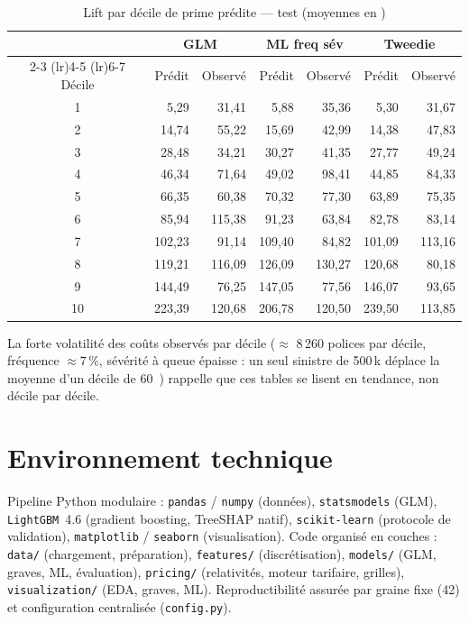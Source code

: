 \documentclass[11pt,a4paper]{article}
\newcommand{\eur}{\texteuro}
\begin{document}
\begin{table}[H]
\centering
\caption{Lift par décile de prime prédite --- test (moyennes en \eur)}
\small
\begin{tabular}{c rr rr rr}
\toprule
 & \multicolumn{2}{c}{GLM} & \multicolumn{2}{c}{ML freq \texttimes{} sév} & \multicolumn{2}{c}{Tweedie} \\
\cmidrule(lr){2-3} \cmidrule(lr){4-5} \cmidrule(lr){6-7}
Décile & Prédit & Observé & Prédit & Observé & Prédit & Observé \\
\midrule
1  & 5{,}29   & 31{,}41  & 5{,}88   & 35{,}36  & 5{,}30   & 31{,}67 \\
2  & 14{,}74  & 55{,}22  & 15{,}69  & 42{,}99  & 14{,}38  & 47{,}83 \\
3  & 28{,}48  & 34{,}21  & 30{,}27  & 41{,}35  & 27{,}77  & 49{,}24 \\
4  & 46{,}34  & 71{,}64  & 49{,}02  & 98{,}41  & 44{,}85  & 84{,}33 \\
5  & 66{,}35  & 60{,}38  & 70{,}32  & 77{,}30  & 63{,}89  & 75{,}35 \\
6  & 85{,}94  & 115{,}38 & 91{,}23  & 63{,}84  & 82{,}78  & 83{,}14 \\
7  & 102{,}23 & 91{,}14  & 109{,}40 & 84{,}82  & 101{,}09 & 113{,}16 \\
8  & 119{,}21 & 116{,}09 & 126{,}09 & 130{,}27 & 120{,}68 & 80{,}18 \\
9  & 144{,}49 & 76{,}25  & 147{,}05 & 77{,}56  & 146{,}07 & 93{,}65 \\
10 & 223{,}39 & 120{,}68 & 206{,}78 & 120{,}50 & 239{,}50 & 113{,}85 \\
\bottomrule
\end{tabular}
\end{table}

La forte volatilité des coûts observés par décile ($\approx$ 8\,260 polices par décile, fréquence $\approx 7\,\%$, sévérité à queue épaisse : un seul sinistre de 500\,k\eur{} déplace la moyenne d'un décile de 60~\eur) rappelle que ces tables se lisent en tendance, non décile par décile.

\section{Environnement technique}

Pipeline Python modulaire : \texttt{pandas} / \texttt{numpy} (données), \texttt{statsmodels} (GLM), \texttt{LightGBM}~4.6 (gradient boosting, TreeSHAP natif), \texttt{scikit-learn} (protocole de validation), \texttt{matplotlib} / \texttt{seaborn} (visualisation). Code organisé en couches : \texttt{data/} (chargement, préparation), \texttt{features/} (discrétisation), \texttt{models/} (GLM, graves, ML, évaluation), \texttt{pricing/} (relativités, moteur tarifaire, grilles), \texttt{visualization/} (EDA, graves, ML). Reproductibilité assurée par graine fixe (42) et configuration centralisée (\texttt{config.py}).
\end{document}
